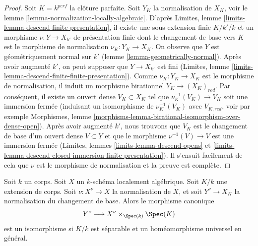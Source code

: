 \begin{proof}
 Soit $K = k^{perf}$ la clôture parfaite. Soit $Y_K$
la normalisation de $X_K$, voir le lemme \ref{lemma-normalization-locally-algebraic}.
D'après Limites, lemme \ref{limits-lemma-descend-finite-presentation},
il existe une sous-extension finie $K/k'/k$ et un morphisme 
$\nu : Y \to X_{k'}$ de présentation finie dont le changement de base vers $K$
 est le morphisme de normalisation $\nu_K : Y_K \to X_K$.
On observe que $Y$ est géométriquement normal sur $k'$
 (lemme \ref{lemma-geometrically-normal}).
Après avoir augmenté $k'$, on peut supposer que $Y \to X_{k'}$ est fini
(Limites, lemme \ref{limits-lemma-descend-finite-finite-presentation}).
Comme $\nu_K : Y_K \to X_K$ est le morphisme de normalisation,
il induit un morphisme birationnel $Y_K \to (X_K)_{red}$.
Par conséquent, il existe un ouvert dense $V_K \subset X_K$ tel que 
$\nu_K^{-1}(V_K) \to V_K$ soit une immersion
fermée (induisant un isomorphisme de $\nu_K^{-1}(V_K)$ avec $V_{K, red}$,
voir par exemple Morphismes, lemme 
\ref{morphisms-lemma-birational-isomorphism-over-dense-open}).
Après avoir augmenté $k'$, nous trouvons que $V_K$ est le changement de base d'un ouvert dense 
$V \subset Y$ et que le morphisme $\nu^{-1}(V) \to V$ est une immersion
fermée (Limites, lemmes \ref{limits-lemma-descend-opens} et 
\ref{limits-lemma-descend-closed-immersion-finite-presentation}).
Il s'ensuit facilement de cela que $\nu$ est le morphisme de
normalisation et la preuve est complète. 
\end{proof}

\begin{lemma}
\label{lemma-normalization-and-change-of-fields}
 Soit $k$ un corps. Soit $X$ un $k$-schéma localement algébrique.
Soit $K/k$ une extension de corps. Soit $\nu : X^\nu \to X$
 la normalisation de $X$, et soit $Y^\nu \to X_K$ la
normalisation du changement de base. Alors le morphisme canonique 
$$
Y^\nu \longrightarrow X^\nu \times_{\Spec(k)} \Spec(K)
$$
 est un isomorphisme si $K/k$ est séparable et un homéomorphisme universel
en général. 
\end{lemma}

